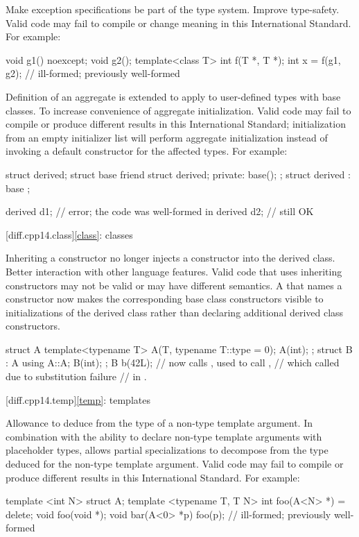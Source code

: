 \change
Make exception specifications be part of the type system.
\rationale
Improve type-safety.
\effect
Valid \CppXIV{} code may fail to compile or change meaning in this
International Standard.
For example:

\begin{codeblock}
void g1() noexcept;
void g2();
template<class T> int f(T *, T *);
int x = f(g1, g2);    // ill-formed; previously well-formed
\end{codeblock}

\change
Definition of an aggregate is extended
to apply to user-defined types with base classes.
\rationale
To increase convenience of aggregate initialization.
\effect
Valid \CppXIV{} code may fail to compile or produce different results in this
International Standard; initialization from an empty initializer list will
perform aggregate initialization instead of invoking a default constructor
for the affected types.
For example:
\begin{codeblock}
struct derived;
struct base {
  friend struct derived;
private:
  base();
};
struct derived : base {};

derived d1{};       // error; the code was well-formed in \CppXIV{}
derived d2;         // still OK
\end{codeblock}

[diff.cpp14.class]{\ref{class}: classes}

\change
Inheriting a constructor no longer injects a constructor into the derived class.
\rationale
Better interaction with other language features.
\effect
Valid \CppXIV{} code that uses inheriting constructors may not be valid
or may have different semantics. A 
that names a constructor now makes the corresponding base class constructors
visible to initializations of the derived class
rather than declaring additional derived class constructors.
\begin{codeblock}
struct A {
  template<typename T> A(T, typename T::type = 0);
  A(int);
};
struct B : A {
  using A::A;
  B(int);
};
B b(42L); // now calls , used to call ,
          // which called  due to substitution failure
          // in .
\end{codeblock}

[diff.cpp14.temp]{\ref{temp}: templates}

\change
Allowance to deduce from the type of a non-type template argument.
\rationale
In combination with the ability to declare
non-type template arguments with placeholder types,
allows partial specializations to decompose
from the type deduced for the non-type template argument.
\effect
Valid \CppXIV{} code may fail to compile
or produce different results in this International Standard.
For example:
\begin{codeblock}
template <int N> struct A;
template <typename T, T N> int foo(A<N> *) = delete;
void foo(void *);
void bar(A<0> *p) {
  foo(p); // ill-formed; previously well-formed
}
\end{codeblock}

